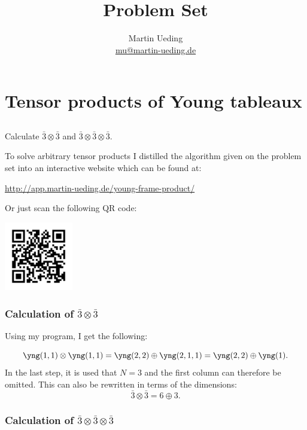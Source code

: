 \documentclass[11pt, english, fleqn, DIV=15, headinclude, BCOR=1cm]{scrartcl}
\title{Problem Set \arabic{problemset}}
\author{
    Martin Ueding \\ \small{\href{mailto:mu@martin-ueding.de}{mu@martin-ueding.de}}
}
\begin{document}
\maketitle

\section{Tensor products of Young tableaux}

\subsection{}

\begin{problem}
    Calculate $\bar 3 \otimes \bar 3$ and $\bar 3 \otimes \bar 3 \otimes \bar
    3$.
\end{problem}

To solve arbitrary tensor products I distilled the algorithm given on the
problem set into an interactive website which can be found at:

\url{http://app.martin-ueding.de/young-frame-product/}

Or just scan the following QR code:

\includegraphics[height=3cm]{app.png}

\subsubsection{Calculation of $\bar 3 \otimes \bar 3$}

Using my program, I get the following:

\[
    \yng(1,1) \otimes \yng(1,1)
    = \yng(2,2) \oplus \yng(2,1,1)
    = \yng(2,2) \oplus \yng(1).
\]
In the last step, it is used that $N = 3$ and the first column can therefore be
omitted. This can also be rewritten in terms of the dimensions:
\[
    \bar 3 \otimes \bar 3 = 6 \oplus 3.
\]

\subsubsection{Calculation of $\bar 3 \otimes \bar 3 \otimes \bar 3$}
\end{document}
